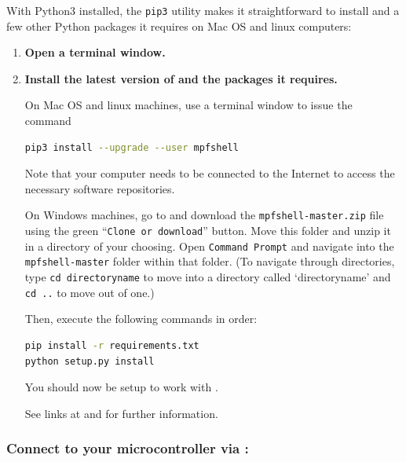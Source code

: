 With Python3 installed, the \texttt{pip3} utility makes it straightforward to install \mpfshell and a few other Python packages it requires on Mac OS and linux computers:
\begin{enumerate}
	\item \textbf{Open a terminal window.}
	\item \textbf{Install the latest version of \mpfshell and the packages it requires.}
	
	On Mac OS and linux machines, use a terminal window to issue the command
\begin{lstlisting}[language=bash]
pip3 install --upgrade --user mpfshell
\end{lstlisting}
		Note that your computer needs to be connected to the Internet to access the necessary software repositories.
		
		\smallskip
		On Windows machines, go to  and download the
		 \lstinline{mpfshell-master.zip} file using the green ``\texttt{Clone or download}'' button. 
		Move this folder and unzip it in a directory of your choosing. 
		Open \lstinline{Command Prompt} and navigate into the \texttt{mpfshell-master} folder within that folder. 
		(To navigate through directories, type \lstinline{cd directoryname} to move into a directory called ‘directoryname’ and \lstinline{cd ..} to move out of one.)
		
		Then, execute the following commands in order:
\begin{lstlisting}[language=bash]
pip install -r requirements.txt
python setup.py install
\end{lstlisting}
		You should now be setup to work with \mpfshell.
		
		See links at  and  for further information.
\end{enumerate}

\subsubsection{\howto Connect to your microcontroller via \mpfshell:}


